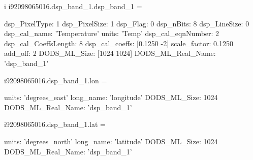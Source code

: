 \begin{vcode}{i}
i92098065016.dsp_band_1.dsp_band_1 =

           dsp_PixelType: 1
           dsp_PixelSize: 1
                dsp_Flag: 0
               dsp_nBits: 8
            dsp_LineSize: 0
            dsp_cal_name: 'Temperature'
                   units: 'Temp'
       dsp_cal_eqnNumber: 2
    dsp_cal_CoeffsLength: 8
          dsp_cal_coeffs: [0.1250 -2]
            scale_factor: 0.1250
                 add_off: 2
            DODS_ML_Size: [1024 1024]
       DODS_ML_Real_Name: 'dsp_band_1'

i92098065016.dsp_band_1.lon =

              units: 'degrees_east'
          long_name: 'longitude'
       DODS_ML_Size: 1024
  DODS_ML_Real_Name: 'dsp_band_1'

i92098065016.dsp_band_1.lat =

              units: 'degrees_north'
          long_name: 'latitude'
       DODS_ML_Size: 1024
  DODS_ML_Real_Name: 'dsp_band_1'
\end{vcode}